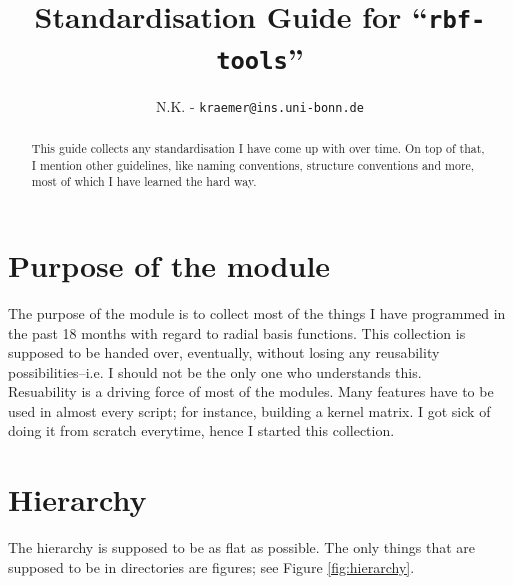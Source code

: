 \documentclass[12pt]{article}
\title{Standardisation Guide for ``\texttt{rbf-tools}''}
\author{N.K. - \texttt{kraemer@ins.uni-bonn.de}}
\begin{document}
\maketitle
\begin{abstract}
This guide collects any standardisation I have come up with over time. On top of that, I mention other guidelines, like naming conventions, structure conventions and more, most of which I have learned the hard way.
\end{abstract}
\begin{figure}[h]
\centering
\begin{minipage}{0.5\textwidth}
\tableofcontents
\end{minipage}
\end{figure}




\section{Purpose of the module}

The purpose of the module is to collect most of the things I have programmed in the past 18 months with regard to radial basis functions. This collection is supposed to be handed over, eventually, without losing any reusability possibilities--i.e. I should not be the only one who understands this.\\

Resuability is a driving force of most of the modules. Many features have to be used in almost every script; for instance, building a kernel matrix. I got sick of doing it from scratch everytime, hence I started this collection.


\section{Hierarchy}
The hierarchy is supposed to be as flat as possible. The only things that are supposed to be in directories are figures; see Figure \ref{fig:hierarchy}.
\end{document}
